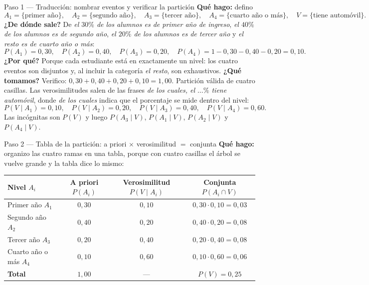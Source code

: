 \documentclass[11pt]{article}
\begin{document}
\begin{sol}

\begin{paso}{Paso 1 --- Traducción: nombrar eventos y verificar la partición}
\textbf{Qué hago:} defino
\[
A_1=\{\text{primer año}\},\quad A_2=\{\text{segundo año}\},\quad A_3=\{\text{tercer año}\},\quad A_4=\{\text{cuarto año o más}\},\quad V=\{\text{tiene automóvil}\}.
\]
\textbf{¿De dónde sale?} De \emph{el $30\%$ de los alumnos es de primer año de ingreso}, \emph{el $40\%$ de los alumnos es de segundo año}, \emph{el $20\%$ de los alumnos es de tercer año} y \emph{el resto es de cuarto año o más}:
\[
P(A_1)=0,30,\quad P(A_2)=0,40,\quad P(A_3)=0,20,\quad P(A_4)=1-0,30-0,40-0,20=0,10.
\]
\textbf{¿Por qué?} Porque cada estudiante está en exactamente un nivel: los cuatro eventos son disjuntos y, al incluir la categoría \emph{el resto}, son exhaustivos.
\textbf{¿Qué tomamos?} Verifico: $0,30+0,40+0,20+0,10=1,00$. Partición válida de cuatro casillas. Las verosimilitudes salen de las frases \emph{de los cuales, el $\ldots\%$ tiene automóvil}, donde \emph{de los cuales} indica que el porcentaje se mide dentro del nivel:
\[
P(V\mid A_1)=0,10,\quad P(V\mid A_2)=0,20,\quad P(V\mid A_3)=0,40,\quad P(V\mid A_4)=0,60.
\]
Las incógnitas son $P(V)$ y luego $P(A_3\mid V)$, $P(A_1\mid V)$, $P(A_2\mid V)$ y $P(A_4\mid V)$.
\end{paso}

\begin{paso}{Paso 2 --- Tabla de la partición: a priori $\times$ verosimilitud $=$ conjunta}
\textbf{Qué hago:} organizo las cuatro ramas en una tabla, porque con cuatro casillas el árbol se vuelve grande y la tabla dice lo mismo:

\begin{center}
\begin{tabular}{|l|c|c|c|}
\hline
\textbf{Nivel }$A_i$ & \textbf{A priori }$P(A_i)$ & \textbf{Verosimilitud }$P(V\mid A_i)$ & \textbf{Conjunta }$P(A_i\cap V)$\\
\hline
Primer año $A_1$        & $0,30$ & $0,10$ & $0,30\cdot 0,10=0,03$\\
Segundo año $A_2$       & $0,40$ & $0,20$ & $0,40\cdot 0,20=0,08$\\
Tercer año $A_3$        & $0,20$ & $0,40$ & $0,20\cdot 0,40=0,08$\\
Cuarto año o más $A_4$  & $0,10$ & $0,60$ & $0,10\cdot 0,60=0,06$\\
\hline
\textbf{Total}          & $1,00$ & --- & $P(V)=0,25$\\
\hline
\end{tabular}
\end{center}


\end{paso}
\end{sol}
\end{document}
